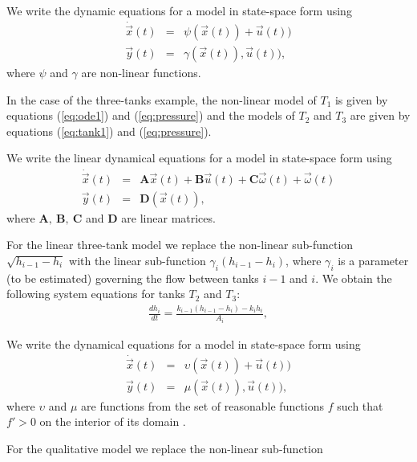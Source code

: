 \begin{definition}
We write the dynamic equations for a model in state-space form using
\begin{eqnarray}\label{eq:nonlinear}
\dot{\vec{x}}(t) & = & \psi (\vec{x}(t)) + \vec{u}(t))\\
\vec{y}(t) & = & \gamma (\vec{x}(t)), \vec{u}(t)),
\end{eqnarray}
where $\psi$ and $\gamma$ are non-linear functions.
\end{definition}
%
In the case of the three-tanks example, the non-linear model of $T_1$
is given by equations (\ref{eq:ode1}) and (\ref{eq:pressure}) and the
models of $T_2$ and $T_3$ are given by equations (\ref{eq:tank1}) and
(\ref{eq:pressure}).
%
\begin{definition}
We write the linear dynamical equations for a model in state-space form using
\begin{eqnarray}\label{eq:linear}
\dot{\vec{x}}(t) & = & \mathbf{A} \vec{x}(t) + \mathbf{B} \vec{u}(t) + \mathbf{C} \vec{\omega}(t) +  \vec{\omega}(t)\\
\vec{y}(t) & = & \mathbf{D} (\vec{x}(t)),
\end{eqnarray}
where $\mathbf{A}, ~ \mathbf{B},~\mathbf{C}$ and $\mathbf{D}$ are linear matrices.
\end{definition}
%
For the linear three-tank model we replace the non-linear sub-function
$\sqrt{h_{i - 1} - h_i}$ with the linear sub-function $\gamma_i (h_{i
- 1} - h_i)$, where $\gamma_i$ is a parameter (to be estimated)
governing the flow between tanks $i - 1$ and $i$. We obtain the
following system equations for tanks $T_2$ and $T_3$:
%
\begin{eqnarray}\label{eq:lineartank}
%
\frac{d h_i}{dt} = \frac{k_{i - 1}(h_{i - 1} - h_{i}) - k_i {h_i}}{A_i},
%
\end{eqnarray}
%
\begin{definition}
We write the dynamical equations for a model in state-space form using
\begin{eqnarray}\label{qual-model}
\dot{\vec{x}}(t) & = & \upsilon (\vec{x}(t)) + \vec{u}(t))\\
\vec{y}(t) & = & \mu (\vec{x}(t)), \vec{u}(t)),
\end{eqnarray}
where $\upsilon$ and $\mu$ are functions from the set of reasonable
functions $f$ such that $f' > 0$ on the interior of its domain
\citep{kuipers1994composition}.
\end{definition}
%
For the qualitative model we replace the non-linear sub-function
